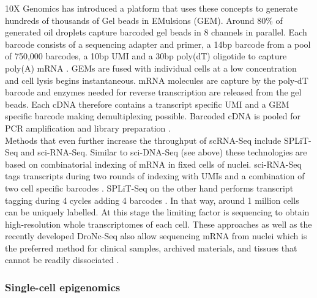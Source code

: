 \newpage

10X Genomics\texttrademark{} has introduced a platform that uses these concepts to generate hundreds of thousands of Gel beads in EMulsions (GEM). Around 80\% of generated oil droplets capture barcoded gel beads in 8 channels in parallel. Each barcode consists of a sequencing adapter and primer, a 14bp barcode from a pool of 750,000 barcodes, a 10bp UMI and a 30bp poly(dT) oligotide to capture poly(A) mRNA \citep{Zheng2017}. GEMs are fused with individual cells at a low concentration and cell lysis begins instantaneous. mRNA molecules are capture by the poly-dT barcode and enzymes needed for reverse transcription are released from the gel beads. Each cDNA therefore contains a transcript specific UMI and a GEM specific barcode making demultiplexing possible. Barcoded cDNA is pooled for PCR amplification and library preparation \citep{Zheng2017}.\\

Methods that even further increase the throughput of scRNA-Seq include \gls{SPLiT-Seq} and sci-RNA-Seq. Similar to sci-DNA-Seq (see above) these technologies are based on combinatorial indexing of mRNA in fixed cells of nuclei. sci-RNA-Seq tags transcripts during two rounds of indexing with UMIs and a combination of two cell specific barcodes \citep{Cao2017}.  SPLiT-Seq on the other hand performs transcript tagging during 4 cycles adding 4 barcodes \citep{Rosenberg2018}. In that way, around 1 million cells can be uniquely labelled. At this stage the limiting factor is sequencing to obtain high-resolution whole transcriptomes of each cell.	These approaches as well as the recently developed \gls{DroNc-Seq} also allow sequencing mRNA from nuclei which is the preferred method for clinical samples, archived materials, and tissues that cannot be readily dissociated \citep{Habib2017}. 


\subsubsection{Single-cell epigenomics}

